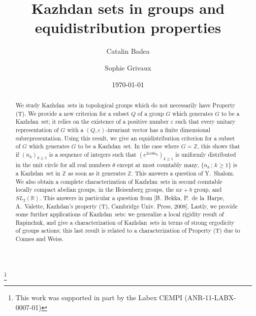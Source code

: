 \documentclass[11pt,english,a4paper]{smfart}
\author{Catalin Badea}
\author{Sophie Grivaux}
\date{\today}
\title[Kazhdan sets and equidistribution properties]{Kazhdan sets in groups and equidistribution properties}
\numberwithin{equation}{section}
\theoremstyle{definition}
\begin{document}
\begin{abstract}
 We study {Kazhdan}\ sets in topological groups which do not necessarily have 
Property (T). We provide a new criterion for a subset ${Q}$ of 
a group $G$ which generates $G$ to be a {Kazhdan}\ set; it relies on the 
existence of a positive number $\varepsilon$ such that every unitary representation of $G$ with a 
$({Q},\varepsilon )$-invariant vector has a finite dimensional 
subrepresentation. Using this result, we give an equidistribution 
criterion for a subset of $G$ which generates $G$ to be a {Kazhdan}\ set. In the 
case 
where $G={\ensuremath{\mathbb Z}}$, this shows that if $(n_{k})_{k\ge 1}$ is a sequence of integers such that $(e^{2i\pi \theta 
n_{k}})_{k\ge 1}$ is uniformly distributed in the unit circle for all 
real numbers $\theta $ except at most countably many, 
$\{n_{k}\,;\,k\ge 1\}$ is a {Kazhdan}\ set in ${\ensuremath{\mathbb Z}}$ as soon as it generates ${\ensuremath{\mathbb Z}}$. 
This answers a question of Y.\ Shalom. 
We also obtain a complete characterization of {Kazhdan}\ sets in second countable locally compact abelian groups, in the Heisenberg groups, the $ax+b$ group, and $SL_2({\ensuremath{\mathbb R}})$.
This answers in particular a question from 
[B.~Bekka, P.~de la~Harpe, A.~Valette, Kazhdan's property (T), 
Cambridge Univ. Press, 2008].
Lastly, we provide some further applications of {Kazhdan}\ sets: we generalize a local rigidity result of Rapinchuk, and give a characterization of {Kazhdan}\ sets in terms of strong ergodicity of groups actions; this last result is related to a characterization of Property (T) due to Connes and Weiss.
\end{abstract}
\thanks{This work was supported in part by the Labex CEMPI (ANR-11-LABX-0007-01)}
\maketitle
\end{document}
